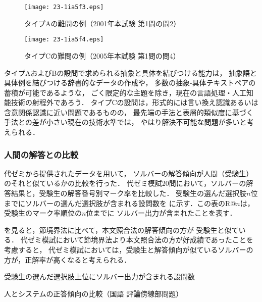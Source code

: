 \documentclass[japanese]{jnlp_1.4b}
\def\TABREF#1{}
\begin{document}
\begin{figure}[t]
\begin{center}
\texttt{[image: 23-1ia5f3.eps]}
\end{center}
\caption{タイプAの難問の例（2001年本試験 第1問の問2）}
\label{fig:kokugo:difficultA}
\end{figure}
\begin{figure}[t]
\begin{center}
\texttt{[image: 23-1ia5f4.eps]}
\end{center}
\caption{タイプCの難問の例（2005年本試験 第1問の問4）}
\label{fig:kokugo:difficult}
\end{figure}

タイプAおよびBの設問で求められる抽象と具体を結びつける能力は，
抽象語と具体例を結びつける辞書的なデータの作成や，
多数の抽象-具体テキストペアの蓄積が可能であるような，
ごく限定的な主題を除き，現在の言語処理・人工知能技術の射程外であろう．
タイプCの設問は，形式的には言い換え認識あるいは含意関係認識に近い問題であるものの，
最先端の手法と表層的類似度に基づく手法との差が小さい現在の技術水準\cite{RITE2}では，
やはり解決不可能な問題が多いと考えられる．


\subsubsection{人間の解答との比較}

代ゼミから提供されたデータを用いて，
ソルバーの解答傾向が人間（受験生）のそれと似ているかの比較を行った．
代ゼミ模試20問において，ソルバーの解答結果と，受験生の解答番号別マーク率を比較した．
受験生の選んだ選択肢$n$位までにソルバーの選んだ選択肢が含まれる設問数を
\TABREF{tab:kokugo:human1}に示す．この表のR@$n$は，受験生のマーク率順位の$n$位までに
ソルバー出力が含まれたことを表す．

\TABREF{tab:kokugo:human1}を見ると，節境界法に比べて，本文照合法の解答傾向の方が
受験生と似ている．
代ゼミ模試において節境界法より本文照合法の方が好成績であったことを考慮すると，
代ゼミ模試においては，受験生と解答傾向が似ているソルバーの方が，正解率が高くなると考えられる．

\begin{table}[t]
\caption{受験生の選んだ選択肢上位にソルバー出力が含まれる設問数}
\label{tab:kokugo:human1}

\end{table}
\begin{table}[t]
\caption{人とシステムの正答傾向の比較（国語 評論傍線部問題）}
\label{tab:kokugo:cross}

\end{table}
\end{document}
